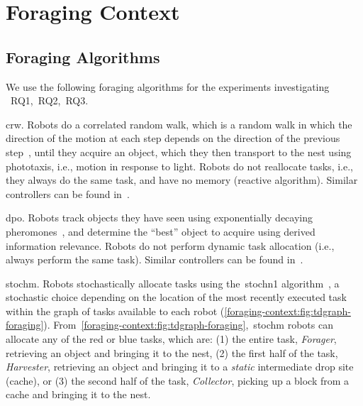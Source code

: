 \chapter{Foraging Context}\label{chap:foraging-context}

\section{Foraging Algorithms}\label{foraging-context:sec:foraging-alg}
%
We use the following foraging algorithms for the experiments investigating
~\gls{RQ1},~\gls{RQ2},~\gls{RQ3}.

\gls{crw}. Robots do a correlated random walk, which is a random walk
in which the direction of the motion at each step depends on the direction of
the previous step~\cite{Renshaw1981}, until they acquire an object, which they
then transport to the nest using phototaxis, i.e., motion in response to
light. Robots do not reallocate tasks, i.e., they always do the same task, and
have no memory (reactive algorithm). Similar controllers can be found
in~\cite{Lerman2001,Galstyan2005}.

\gls{dpo}.  Robots track objects they have seen using exponentially decaying
pheromones~\cite{Hecker2015,Harwell2020a}, and determine the ``best'' object to
acquire using derived information relevance. Robots do not perform dynamic task
allocation (i.e., always perform the same task). Similar controllers can be
found in~\cite{Talamali2020}.

\gls{stochm}. Robots stochastically allocate tasks using the~\gls{stochn1}
algorithm~\cite{Harwell2020a}, a stochastic choice depending on the location of
the most recently executed task within the graph of tasks available to each
robot
(\cref{foraging-context:fig:tdgraph-foraging}). From~\cref{foraging-context:fig:tdgraph-foraging},~\gls{stochm}
robots can allocate any of the red or blue tasks, which are: (1) the entire
task, \emph{Forager}, retrieving an object and bringing it to the nest, (2) the
first half of the task, \emph{Harvester}, retrieving an object and bringing it
to a \emph{static} intermediate drop site (cache), or (3) the second half of the
task, \emph{Collector}, picking up a block from a cache and bringing it to the
nest.

